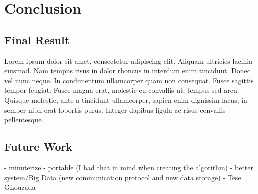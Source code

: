 
\chapter{Conclusion} %

\label{Chapter9} %



\section{Final Result}

Lorem ipsum dolor sit amet, consectetur adipiscing elit. Aliquam ultricies lacinia euismod. Nam tempus risus in dolor rhoncus in interdum enim tincidunt. Donec vel nunc neque. In condimentum ullamcorper quam non consequat. Fusce sagittis tempor feugiat. Fusce magna erat, molestie eu convallis ut, tempus sed arcu. Quisque molestie, ante a tincidunt ullamcorper, sapien enim dignissim lacus, in semper nibh erat lobortis purus. Integer dapibus ligula ac risus convallis pellentesque.

\section{Future Work}

- minuterize
- portable (I had that in mind when creating the algorithm)
- better system/Big Data (new communication protocol and new data storage) - Tese GLouzada